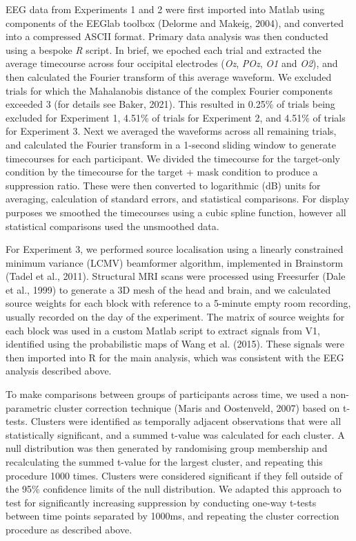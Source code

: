 \documentclass[
]{article}
\begin{document}
EEG data from Experiments 1 and 2 were first imported into Matlab using components of the EEGlab toolbox (Delorme and Makeig, 2004), and converted into a compressed ASCII format. Primary data analysis was then conducted using a bespoke \emph{R} script. In brief, we epoched each trial and extracted the average timecourse across four occipital electrodes (\emph{Oz}, \emph{POz}, \emph{O1} and \emph{O2}), and then calculated the Fourier transform of this average waveform. We excluded trials for which the Mahalanobis distance of the complex Fourier components exceeded 3 (for details see Baker, 2021). This resulted in 0.25\% of trials being excluded for Experiment 1, 4.51\% of trials for Experiment 2, and 4.51\% of trials for Experiment 3. Next we averaged the waveforms across all remaining trials, and calculated the Fourier transform in a 1-second sliding window to generate timecourses for each participant. We divided the timecourse for the target-only condition by the timecourse for the target + mask condition to produce a suppression ratio. These were then converted to logarithmic (dB) units for averaging, calculation of standard errors, and statistical comparisons. For display purposes we smoothed the timecourses using a cubic spline function, however all statistical comparisons used the unsmoothed data.

For Experiment 3, we performed source localisation using a linearly constrained minimum variance (LCMV) beamformer algorithm, implemented in Brainstorm (Tadel et al., 2011). Structural MRI scans were processed using Freesurfer (Dale et al., 1999) to generate a 3D mesh of the head and brain, and we calculated source weights for each block with reference to a 5-minute empty room recording, usually recorded on the day of the experiment. The matrix of source weights for each block was used in a custom Matlab script to extract signals from V1, identified using the probabilistic maps of Wang et al. (2015). These signals were then imported into R for the main analysis, which was consistent with the EEG analysis described above.

To make comparisons between groups of participants across time, we used a non-parametric cluster correction technique (Maris and Oostenveld, 2007) based on t-tests. Clusters were identified as temporally adjacent observations that were all statistically significant, and a summed t-value was calculated for each cluster. A null distribution was then generated by randomising group membership and recalculating the summed t-value for the largest cluster, and repeating this procedure 1000 times. Clusters were considered significant if they fell outside of the 95\% confidence limits of the null distribution. We adapted this approach to test for significantly increasing suppression by conducting one-way t-tests between time points separated by 1000ms, and repeating the cluster correction procedure as described above.
\end{document}
